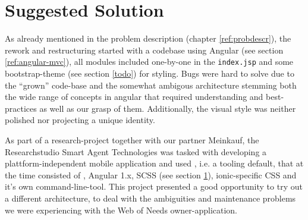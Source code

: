 
\chapter{Suggested Solution}




As already mentioned in the problem description (chapter \ref{ref:probdescr}), the rework and restructuring started with a codebase using Angular (see section \ref{ref:angular-mvc}), all modules included one-by-one in the \texttt{index.jsp} and some bootstrap-theme (see section \ref{todo}) for styling. Bugs were hard to solve due to the ``grown'' code-base and the somewhat ambigous architecture stemming both the wide range of concepts in angular that required understanding and best-practices
as well as our grasp of them. Additionally, the visual style was neither polished nor projecting a unique identity.

As part of a research-project together with our partner Meinkauf, the Researchstudio Smart Agent Technologies was tasked with developing a plattform-independent mobile application and used , i.e. a tooling default, that at the time consisted of , Angular 1.x, SCSS (see section \ref{}), ionic-specific CSS and it's own command-line-tool. This project presented a good opportunity to try out a different architecture, to deal with the ambiguities and maintenance problems we were experiencing with the Web of Needs owner-application. 


